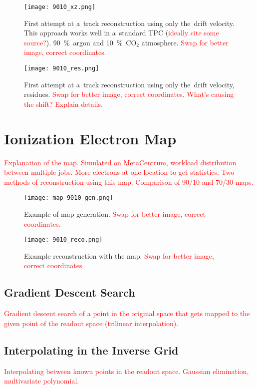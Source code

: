 		\begin{figure}
			\centering
			\texttt{[image: 9010\_xz.png]}
			\caption{First attempt at a~track reconstruction using only the~drift velocity. This approach works well in a~standard \ac{TPC} (\textcolor{red}{ideally cite some source?}). 90~\%~argon and 10~\%~CO$_2$ atmosphere. \textcolor{red}{Swap for better image, correct coordinates.}}
			\label{fig:9010xz}
		\end{figure}
		
		\begin{figure}
			\centering
			\texttt{[image: 9010\_res.png]}
			\caption{First attempt at a~track reconstruction using only the~drift velocity, residues. \textcolor{red}{Swap for better image, correct coordinates. What's causing the shift? Explain details.}}
			\label{fig:9010res}
		\end{figure}
	
	\section{Ionization Electron Map}
	\label{sec:map}
		\textcolor{red}{Explanation of the map. Simulated on MetaCentrum, workload distribution between multiple jobs. More electrons at one location to get statistics. Two methods of reconstruction using this map. Comparison of 90/10 and 70/30 maps.}
		
		\begin{figure}
			\centering
			\texttt{[image: map\_9010\_gen.png]}
			\caption{Example of map generation. \textcolor{red}{Swap for better image, correct coordinates.}}
			\label{fig:map9010gen}
		\end{figure}
		
		\begin{figure}
			\centering
			\texttt{[image: 9010\_reco.png]}
			\caption{Example reconstruction with the map. \textcolor{red}{Swap for better image, correct coordinates.}}
			\label{fig:9010reco}
		\end{figure}
		
		\subsection{Gradient Descent Search}
			\textcolor{red}{Gradient descent search of a point in the original space that gets mapped to the given point of the readout space (trilinear interpolation).}
		
		\subsection{Interpolating in the Inverse Grid}
			\textcolor{red}{Interpolating between known points in the readout space. Gaussian elimination, multivariate polynomial.}
			
